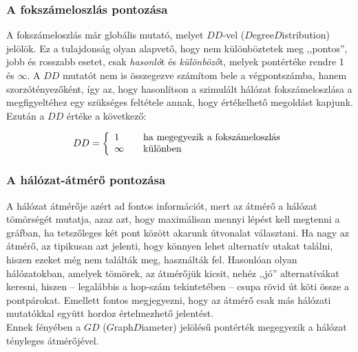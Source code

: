     \subsubsection{A fokszámeloszlás pontozása}
    A fokszámeloszlás már globális mutató, melyet $DD$-vel ($D$egree$D$istribution) jelölök. Ez a tulajdonság olyan alapvető, hogy nem különböztetek meg ,,pontos'', jobb és rosszabb esetet, csak \textit{hasonló}t és \textit{különböző}t, melyek pontértéke rendre 1 és $\infty$. A $DD$ mutatót nem is összegezve számítom bele a végpontszámba, hanem szorzótényezőként, így az, hogy hasonlítson a szimulált hálózat fokszámeloszlása a megfigyeltéhez egy szükséges feltétele annak, hogy értékelhető megoldást kapjunk. Ezután a $DD$ értéke a következő:

    $$ DD = \left\{
    \begin{array}{l l}
      1 & \quad \text{ha megegyezik a fokszámeloszlás}\\
      \infty & \quad \text{különben}
    \end{array} \right.$$


    \subsubsection{A hálózat-átmérő pontozása}
    A hálózat átmérője azért ad fontos információt, mert az átmérő a hálózat tömörségét mutatja, azaz azt, hogy maximálisan mennyi lépést kell megtenni a gráfban, ha tetszőleges két pont között akarunk útvonalat választani. Ha nagy az átmérő, az tipikusan azt jelenti, hogy könnyen lehet alternatív utakat találni, hiszen ezeket még nem találták meg, használták fel. Hasonlóan olyan hálózatokban, amelyek tömörek, az átmérőjük kicsit, nehéz ,,jó'' alternatívákat keresni, hiszen -- legalábbis a hop-szám tekintetében -- csupa rövid út köti össze a pontpárokat. Emellett fontos megjegyezni, hogy az átmérő csak más hálózati mutatókkal együtt hordoz értelmezhető jelentést.\\
    Ennek fényében a $GD$ ($G$raph$D$iameter) jelölésű pontérték megegyezik a hálózat tényleges átmérőjével.

